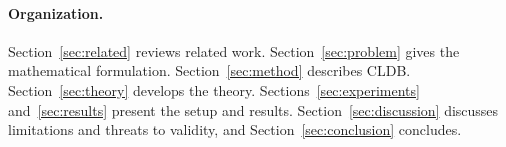 \paragraph{Organization.}
Section~\ref{sec:related} reviews related work. Section~\ref{sec:problem} gives
the mathematical formulation. Section~\ref{sec:method} describes CLDB.
Section~\ref{sec:theory} develops the theory. Sections~\ref{sec:experiments}
and~\ref{sec:results} present the setup and results.
Section~\ref{sec:discussion} discusses limitations and threats to validity, and
Section~\ref{sec:conclusion} concludes.
